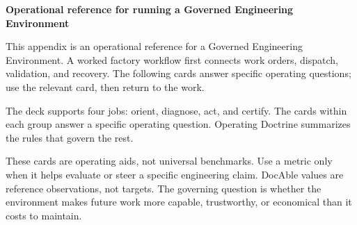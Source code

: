 

\textbf{Operational reference for running a Governed Engineering Environment}

This appendix is an operational reference for a Governed Engineering Environment. A worked factory workflow first connects work orders, dispatch, validation, and recovery. The following cards answer specific operating questions; use the relevant card, then return to the work.

The deck supports four jobs: orient, diagnose, act, and certify. The cards within each group answer a specific operating question. Operating Doctrine summarizes the rules that govern the rest.

These cards are operating aids, not universal benchmarks. Use a metric only when it helps evaluate or steer a specific engineering claim. DocAble values are reference observations, not targets. The governing question is whether the environment makes future work more capable, trustworthy, or economical than it costs to maintain.
